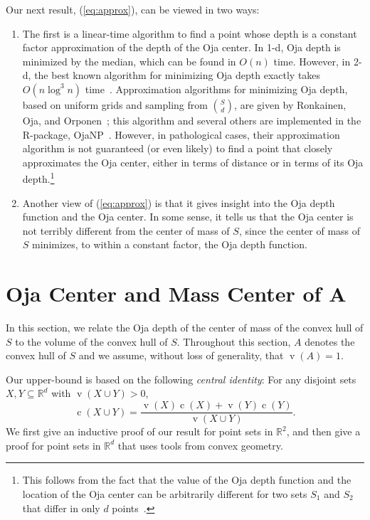 \documentclass[preprint, 12pt]{elsarticle}
\DeclareMathOperator{\vol}{v}
\DeclareMathOperator{\cog}{c}
\newcommand{\R}{\mathbb{R}}
\renewcommand{\eqref}[1]{(\ref{eq:#1})}
\begin{document}
Our next result, \eqref{approx}, can be viewed in two
ways: 
\begin{enumerate}
  \item The first is a linear-time algorithm to find a point whose depth is a constant factor approximation
  of the depth of the Oja center.  In 1-d, Oja depth is minimized by the
  median, which can be found in $O(n)$ time. However, in 2-d, the best
  known algorithm for minimizing Oja depth exactly takes $O(n\log^3 n)$
  time~\cite{alst03}.  Approximation algorithms for minimizing Oja depth,
  based on uniform grids and sampling from $\binom{S}{d}$, are given by
  Ronkainen, Oja, and Orponen~\cite{roo01}; this algorithm and several others are implemented in the R-package, OjaNP~\cite{ojanp}.  However, in pathological
  cases, their approximation algorithm is not guaranteed (or even likely)
  to find a point that closely approximates the Oja center, either in
  terms of distance or in terms of its Oja depth.\footnote{This follows
  from the fact that the value of the Oja depth function and the location
  of the Oja center can be arbitrarily different for two sets $S_1$
  and $S_2$ that differ in only $d$ points~\cite{not90}.}

  \item Another view of \eqref{approx} is that it gives insight into
  the Oja depth function and the Oja center.  In some sense, it tells
  us that the Oja center is not terribly different from the center of
  mass of $S$, since the center of mass of $S$ minimizes, to within a
  constant factor, the Oja depth function.
\end{enumerate}

\section{Oja Center and Mass Center of $\mathbf{A}$}
\label{sec:gravcenter}

In this section, we relate the Oja depth of the center of mass of the
convex hull of $S$ to the volume of the convex hull of $S$.  Throughout
this section, $A$ denotes the convex hull of $S$ and we assume, without
loss of generality, that $\vol(A)=1$.

Our upper-bound is based on the following \emph{central identity}:
For any disjoint sets $X,Y\subseteq\R^d$ with $\vol(X\cup Y) > 0$,
\[
   \cog(X \cup Y) = \frac{\vol(X)\cog(X) + \vol(Y)\cog(Y)}{\vol(X \cup Y)}.
\]
We first give an inductive proof of our result for point sets in $\R^2$,
and then give a proof for point sets in $\R^d$ that uses tools from
convex geometry.
\end{document}
